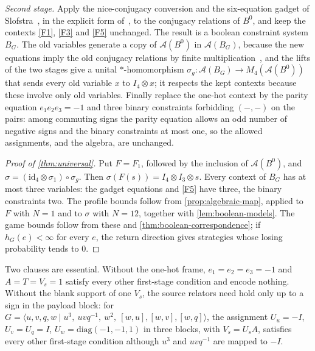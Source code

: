 \emph{Second stage.} Apply the nice-conjugacy conversion and the six-equation gadget of Slofstra~\cite[Lemma~4.4 and
Proposition~4.2]{Slo19}, in the explicit form of~\cite[proof of Lemma~B.1, Steps~3 and~4]{DM-game}, to the conjugacy
relations of $B^0$, and keep the contexts \ref{F1}, \ref{F3} and \ref{F5} unchanged. The result is a boolean constraint system
$B_G$. The old variables generate a copy of $\mathcal A(B^0)$ in $\mathcal A(B_G)$, because the new equations imply the old
conjugacy relations by finite multiplication~\cite{Slo19,DM-game}, and the lifts of the two stages give a unital
$*$-homomorphism $\sigma_g:\mathcal A(B_G)\to M_4(\mathcal A(B^0))$ that sends every old variable $x$ to $I_4\otimes x$; it
respects the kept contexts because these involve only old variables. Finally replace the one-hot context by the parity
equation $e_1e_2e_3=-1$ and three binary constraints forbidding $(-,-)$ on the pairs: among commuting signs the parity
equation allows an odd number of negative signs and the binary constraints at most one, so the allowed assignments, and
the algebra, are unchanged.

\begin{proof}[Proof of \cref{thm:universal}]
Put $F=F_1$, followed by the inclusion of $\mathcal A(B^0)$, and $\sigma=(\mathrm{id}_4\otimes\sigma_1)\circ\sigma_g$. Then
$\sigma(F(s))=I_4\otimes I_3\otimes s$. Every context of $B_G$ has at most three variables: the gadget equations and \ref{F5}
have three, the binary constraints two. The profile bounds follow from \cref{prop:algebraic-map}, applied to $F$ with $N=1$
and to $\sigma$ with $N=12$, together with \cref{lem:boolean-models}. The game bounds follow from these and
\cref{thm:boolean-correspondence}; if $h_G(e)<\infty$ for every $e$, the return direction gives strategies whose losing
probability tends to $0$.
\end{proof}

Two clauses are essential. Without the one-hot frame, $e_1=e_2=e_3=-1$ and $A=T=V_s=1$ satisfy every other first-stage
condition and encode nothing. Without the blank support of one $V_s$, the source relators need hold only up to a sign
in the payload block: for $G=\langle u,v,q,w\mid u^3,\ uvq^{-1},\ w^2,\ [w,u],[w,v],[w,q]\rangle$, the assignment
$U_u=-I$, $U_v=U_q=I$, $U_w=\mathrm{diag}(-1,-1,1)$ in three blocks, with $V_s=U_sA$, satisfies every other first-stage
condition although $u^3$ and $uvq^{-1}$ are mapped to $-I$.

